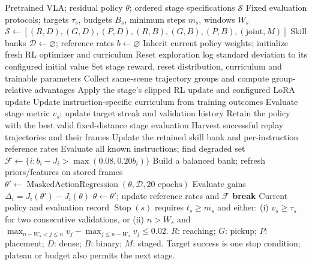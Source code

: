 \begin{algorithm}[t]
\caption{Staged VLA adaptation with conditional skill consolidation}
\label{alg:staged_bootstrapping}
\begin{algorithmic}[1]
\Require Pretrained VLA; residual policy $\theta$; ordered stage specifications $\mathcal S$
\Require Fixed evaluation protocols; targets $\tau_s$, budgets $B_s$, minimum steps $m_s$, windows $W_s$
\State $\mathcal S \gets [(R,D),(G,D),(P,D),(R,B),(G,B),(P,B),(\mathrm{joint},M)]$
\State Skill banks $\mathcal D\gets\varnothing$; reference rates $b\gets\varnothing$
    \State Inherit current policy weights; initialize fresh RL optimizer and curriculum
        \State Reset exploration log standard deviation to its configured initial value
    \EndIf
    \State Set stage reward, reset distribution, curriculum and trainable parameters
    \Repeat
        \State Collect same-scene trajectory groups and compute group-relative advantages
        \State Apply the stage's clipped RL update and configured LoRA update
        \State Update instruction-specific curriculum from training outcomes
            \State Evaluate stage metric $v_s$; update target streak and validation history
        \EndIf
    \State Retain the policy with the best valid fixed-distance stage evaluation
        \State Harvest successful replay trajectories and their frames
        \State Update the retained skill bank and per-instruction reference rates
            \State Evaluate all known instructions; find degraded set
            \State $\mathcal F\gets\{i:b_i-J_i>\max(0.08,0.20b_i)\}$
                \State Build a balanced bank; refresh priors/features on stored frames
                \State $\theta'\gets\operatorname{MaskedActionRegression}(\theta,\mathcal D,20\text{ epochs})$
                \State Evaluate gains $\Delta_i=J_i(\theta')-J_i(\theta)$
                    \State $\theta\gets\theta'$; update reference rates and $\mathcal F$
                \Else
                    \State \textbf{break}
                \EndIf
            \EndFor
        \EndIf
    \EndIf
\EndFor
\State \Return Current policy and evaluation record
\Statex $\operatorname{Stop}(s)$ requires $t_s\ge m_s$ and either:
\Statex \quad (i) $v_s\ge\tau_s$ for two consecutive validations, or
\Statex \quad (ii) $n>W_s$ and $\max_{n-W_s<j\le n}v_j-\max_{j\le n-W_s}v_j\le0.02$.
\Statex $R$: reaching; $G$: pickup; $P$: placement; $D$: dense; $B$: binary; $M$: staged.
\Statex Target success is one stop condition; plateau or budget also permits the next stage.
\end{algorithmic}
\end{algorithm}
